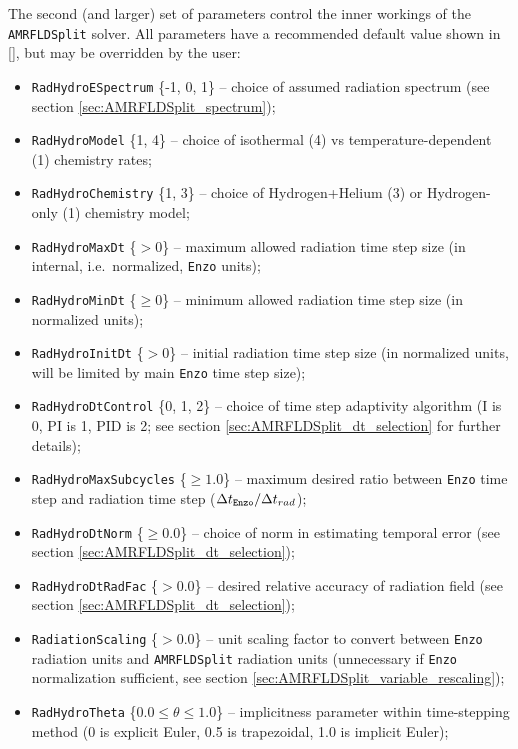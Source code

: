 \documentclass[letterpaper,10pt]{article}
\renewcommand{\(}{\left(}
\renewcommand{\)}{\right)}
\newcommand{\enzo}{{\tt Enzo} }
\begin{document}
The second (and larger) set of parameters control the inner workings
of the {\tt AMRFLDSplit} solver.  All parameters have a recommended
default value shown in [], but may be overridden by the user: 
\begin{itemize}
\item {\tt RadHydroESpectrum} \{-1, 0, 1\; [1]\} -- choice of assumed
  radiation spectrum (see section \ref{sec:AMRFLDSplit_spectrum});
\item {\tt RadHydroModel} \{1, 4\; [1]\} -- choice of isothermal (4)
  vs temperature-dependent (1) chemistry rates;
\item {\tt RadHydroChemistry} \{1, 3\; [1]\} -- choice of
  Hydrogen+Helium (3) or Hydrogen-only (1) chemistry model;
\item {\tt RadHydroMaxDt} \{$>0$\; [$\infty$]\} -- maximum allowed radiation
  time step size (in internal, i.e.~normalized, \enzo units);
\item {\tt RadHydroMinDt} \{$\ge 0$\; [0.0]\} -- minimum allowed
  radiation time step size (in normalized units);
\item {\tt RadHydroInitDt} \{$>0$\; [$\infty$]\} -- initial radiation time
  step size (in normalized units, will be limited by main \enzo time
  step size);
\item {\tt RadHydroDtControl} \{0, 1, 2\; [2]\} -- choice of time step
  adaptivity algorithm (I is 0, PI is 1, PID is 2; see section
  \ref{sec:AMRFLDSplit_dt_selection} for further details);
\item {\tt RadHydroMaxSubcycles} \{$\ge 1.0$\; [1.0]\} -- maximum
  desired ratio between \enzo time step and radiation time step
  ($\Delta t_{\enzo} / \Delta t_{rad}$);
\item {\tt RadHydroDtNorm} \{$\ge 0.0$\; [2.0]\} -- choice of norm in
  estimating temporal error (see section \ref{sec:AMRFLDSplit_dt_selection});
\item {\tt RadHydroDtRadFac} \{$>0.0$\; [$\infty$]\} -- desired relative
  accuracy of radiation field (see section \ref{sec:AMRFLDSplit_dt_selection});
\item {\tt RadiationScaling} \{$>0.0$\; [1.0]\} -- unit scaling factor
  to convert between \enzo radiation units and {\tt AMRFLDSplit}
  radiation units (unnecessary if \enzo normalization sufficient, see
  section \ref{sec:AMRFLDSplit_variable_rescaling});
\item {\tt RadHydroTheta} \{$0.0 \le \theta \le 1.0$\; [1.0]\} --
  implicitness parameter within time-stepping method (0 is explicit
  Euler, 0.5 is trapezoidal, 1.0 is implicit Euler);

\end{itemize}
\end{document}
